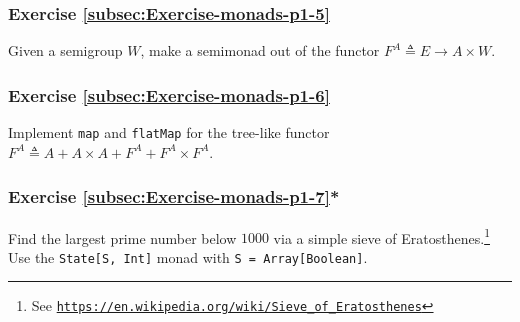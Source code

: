 \subsubsection{Exercise \label{subsec:Exercise-monads-p1-5}\ref{subsec:Exercise-monads-p1-5}}

Given a semigroup $W$, make a semimonad out of the functor $F^{A}\triangleq E\rightarrow A\times W$.

\subsubsection{Exercise \label{subsec:Exercise-monads-p1-6}\ref{subsec:Exercise-monads-p1-6}}

Implement \lstinline!map! and \lstinline!flatMap! for the tree-like
functor $F^{A}\triangleq A+A\times A+F^{A}+F^{A}\times F^{A}$.

\subsubsection{Exercise \label{subsec:Exercise-monads-p1-7}\ref{subsec:Exercise-monads-p1-7}{*}}

Find the largest prime number below $1000$ via a simple sieve of
Eratosthenes.\footnote{See \texttt{\href{https://en.wikipedia.org/wiki/Sieve_of_Eratosthenes}{https://en.wikipedia.org/wiki/Sieve\_of\_Eratosthenes}}}
Use the \lstinline!State[S, Int]! monad with \lstinline!S = Array[Boolean]!.

